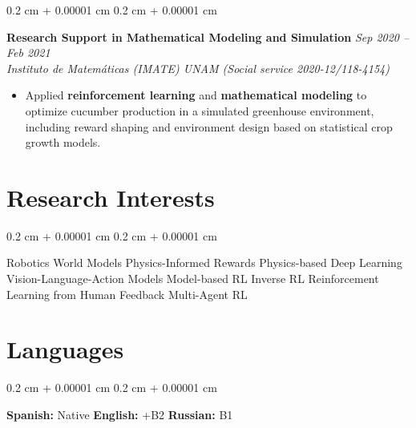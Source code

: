 \documentclass[10pt, letterpaper]{article}
\newenvironment{highlights}{
    \begin{itemize}[
        topsep=0.10 cm,
        parsep=0.10 cm,
        partopsep=0pt,
        itemsep=0pt,
        leftmargin=0.4 cm + 10pt
    ]
}{
    \end{itemize}
}
\newenvironment{onecolentry}{
    \begin{adjustwidth}{
        0.2 cm + 0.00001 cm
    }{
        0.2 cm + 0.00001 cm
    }
}{
    \end{adjustwidth}
}
\begin{document}
\vspace{0.15 cm}

\begin{onecolentry}
\textbf{Research Support in Mathematical Modeling and Simulation} \hfill \textit{Sep 2020 -- Feb 2021} \\
\textit{Instituto de Matemáticas (IMATE) UNAM (Social service 2020-12/118-4154)}
\begin{highlights}
    \item Applied \textbf{reinforcement learning} and \textbf{mathematical modeling} to optimize cucumber production in a simulated greenhouse environment, including reward shaping and environment design based on statistical crop growth models.
\end{highlights}
\end{onecolentry}



\section{Research Interests}

\begin{onecolentry}
Robotics \hspace{0.25cm} World Models \hspace{0.25cm} Physics-Informed Rewards \hspace{0.25cm} Physics-based Deep Learning \hspace{0.25cm} Vision-Language-Action Models \hspace{0.25cm} Model-based RL \hspace{0.25cm} Inverse RL \hspace{0.25cm} Reinforcement Learning from Human Feedback \hspace{0.25cm} Multi-Agent RL
\end{onecolentry}

\section{Languages}

\begin{onecolentry}
\textbf{Spanish:} Native \hspace{0.4cm} \textbf{English:} +B2 \hspace{0.4cm} \textbf{Russian:} B1 \end{onecolentry}
\end{document}
